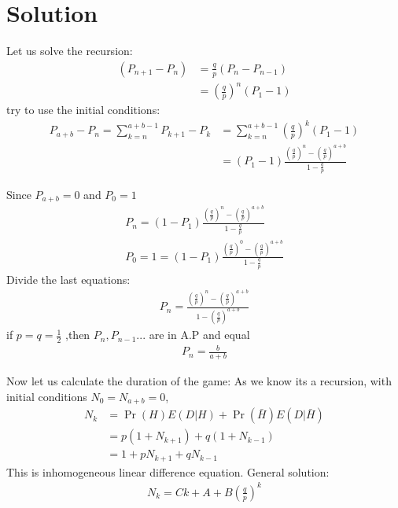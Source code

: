 \documentclass{beamer}
\providecommand{\pr}[1]{\ensuremath{\Pr\left(#1\right)}}
\providecommand{\e}[1]{\ensuremath{E\left(#1\right)}}
\providecommand{\brak}[1]{\ensuremath{\left(#1\right)}}
\begin{document}
\section{Solution}
\begin{frame}{}
Let us solve the recursion:
\begin{align}
 \brak{P_{n+1}-P_n}&=\frac{q}{p}\brak{P_{n}-P_{n-1}} \\
                   &=\brak{\frac{q}{p}}^{n}\brak{P_1-1} 
\end{align}
try to use the initial conditions:
\begin{align}
P_{a+b}-P_{n}=\sum_{k=n}^{a+b-1} P_{k+1}-P_{k}&=\sum_{k=n}^{a+b-1}\brak{\frac{q}{p}}^{k}\brak{P_1-1} \\
&=\brak{P_{1} -1}\frac{\brak{\frac{q}{p}}^{n}-\brak{\frac{q}{p}}^{a+b}}{1-\frac{q}{p}}
\end{align}
\end{frame}
\begin{frame}{}
Since $P_{a+b}=0$ and $P_{0}=1$
\begin{align}
P_{n}=\brak{1-P_{1}}\frac{\brak{\frac{q}{p}}^{n}-\brak{\frac{q}{p}}^{a+b}}{1-\frac{q}{p}} \\
P_{0}=1=\brak{1-P_{1}}\frac{\brak{\frac{q}{p}}^{0}-\brak{\frac{q}{p}}^{a+b}}{1-\frac{q}{p}}
\end{align}
Divide the last equations:
\begin{align}
P_{n}=\frac{\brak{\frac{q}{p}}^{n}-\brak{\frac{q}{p}}^{a+b}}{1-\brak{\frac{q}{p}}^{a+b}}
\end{align}
if $p=q=\frac{1}{2}$ ,then $P_n,P_{n-1}...$ are in A.P and equal
\begin{align}
P_n=\frac{b}{a+b}
\end{align}
\end{frame}
\begin{frame}{}
Now let us calculate the duration of the game:
As we know its a recursion, with initial conditions $N_{0}=N_{a+b}=0$,
\begin{align}
N_k&=\pr{H}\e{D|H}+\pr{\bar{H}}\e{D|\bar{H}}\\
   &=p\brak{1+N_{k+1}}+q\brak{1+N_{k-1}}\\
   &=1+pN_{k+1}+qN_{k-1}
\end{align}
This is inhomogeneous linear difference equation. General solution:
\begin{align}
N_k=Ck+A+B\brak{\frac{q}{p}}^{k}
\end{align}
\end{frame}
\end{document}
